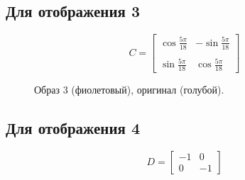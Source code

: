 \documentclass[a5paper, 10pt]{article}
\theoremstyle{definition}
\theoremstyle{plain}
\theoremstyle{remark}
\begin{document}
\newpage
\subsection{Для отображения 3}
\begin{equation}
C =
\begin{bmatrix}
\cos \frac{5\pi}{18} & -\sin \frac{5\pi}{18}\\
\\
\sin \frac{5\pi}{18} & \cos \frac{5\pi}{18}
\end{bmatrix}
\end{equation}

\begin{figure}[h]
\caption{Образ 3 (фиолетовый), оригинал (голубой).}
\end{figure}


\newpage
\subsection{Для отображения 4}
\begin{equation}
D =
\begin{bmatrix}
-1 & 0\\
0 & -1
\end{bmatrix}
\end{equation}
\end{document}
